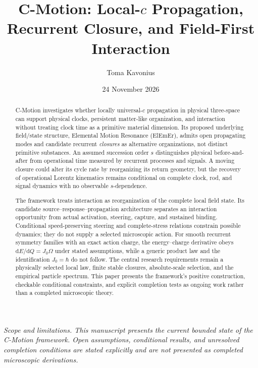 \documentclass[11pt]{article}
\title{\textbf{C-Motion: Local-\texorpdfstring{$c$}{c} Propagation, Recurrent Closure, and Field-First Interaction}}
\author{Toma Kavonius}
\date{24 November 2026}
\theoremstyle{definition}
\begin{document}
\maketitle

\begin{center}
\small\itshape
Scope and limitations.  This manuscript presents the current bounded state of the
C-Motion framework.  Open assumptions, conditional results, and unresolved
completion conditions are stated explicitly and are not presented as completed
microscopic derivations.
\end{center}
\vspace{0.6em}

\begin{abstract}
C-Motion investigates whether locally universal-$c$ propagation in physical
three-space can support physical clocks, persistent matter-like organization,
and interaction without treating clock time as a primitive material dimension.
Its proposed underlying field/state structure, Elemental Motion Resonance
(ElEmEr), admits open propagating modes and candidate recurrent
\emph{closures} as alternative organizations, not distinct primitive
substances. An assumed succession order $s$ distinguishes physical
before-and-after from operational time measured by recurrent processes and
signals. A moving closure could alter its cycle rate by reorganizing its
return geometry, but the recovery of operational Lorentz kinematics remains
conditional on complete clock, rod, and signal dynamics with no observable
$s$-dependence.

The framework treats interaction as reorganization of the complete local
field state. Its candidate source--response--propagation architecture
separates an interaction opportunity from actual activation, steering,
capture, and sustained binding. Conditional speed-preserving steering and
complete-stress relations constrain possible dynamics; they do not supply a
selected microscopic action. For smooth recurrent symmetry families with an
exact action charge, the energy--charge derivative obeys
$\mathrm{d}E/\mathrm{d}Q=J_0\Omega$ under stated assumptions, while a
generic product law and the identification $J_0=\hbar$ do not follow.
The central research requirements remain a physically selected local law,
finite stable closures, absolute-scale selection, and the empirical particle
spectrum. This paper presents the framework's positive construction,
checkable conditional constraints, and explicit completion tests as ongoing
work rather than a completed microscopic theory.
\end{abstract}
\end{document}
